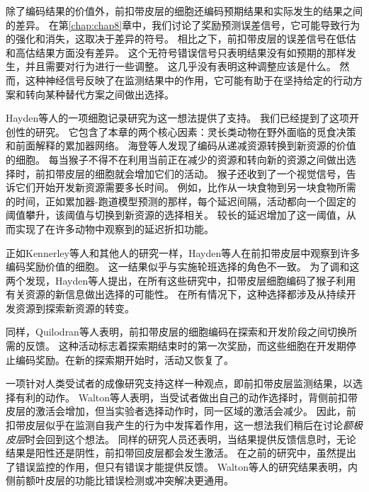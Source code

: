除了编码结果的价值外，前扣带皮层的细胞还编码预期结果和实际发生的结果之间的差异。
在第\ref{chap:chap8}章中，我们讨论了奖励预测误差信号，它可能导致行为的强化和消失，这取决于差异的符号。
相比之下，前扣带皮层的误差信号在低估和高估结果方面没有差异\cite{Hayden et al,2011a}。
这个无符号错误信号只表明结果没有如预期的那样发生，并且需要对行为进行一些调整。
这几乎没有表明这种调整应该是什么。
然而，这种神经信号反映了在监测结果中的作用，它可能有助于在坚持给定的行动方案和转向某种替代方案之间做出选择。\par


Hayden等人\cite{hayden2011neuronal}的一项细胞记录研究为这一想法提供了支持。
我们已经提到了这项开创性的研究。
它包含了本章的两个核心因素：灵长类动物在野外面临的觅食决策和前面解释的累加器网络。
海登等人发现了编码从递减资源转换到新资源的价值的细胞。
每当猴子不得不在利用当前正在减少的资源和转向新的资源之间做出选择时，前扣带皮层的细胞就会增加它们的活动。
猴子还收到了一个视觉信号，告诉它们开始开发新资源需要多长时间。
例如，比作从一块食物到另一块食物所需的时间，正如累加器-跑道模型预测的那样，每个延迟间隔，活动都向一个固定的阈值攀升，该阈值与切换到新资源的选择相关。
较长的延迟增加了这一阈值，从而实现了在许多动物中观察到的延迟折扣功能。\par


正如Kennerley等人和其他人的研究一样\cite{matsumoto2003neuronal,seo2007temporal}，Hayden等人在前扣带皮层中观察到许多编码奖励价值的细胞\cite{hayden2009fictive,hayden2010neurons}。
这一结果似乎与实施轮班选择的角色不一致。
为了调和这两个发现，Hayden等人\cite{hayden2011neuronal}提出，在所有这些研究中，扣带皮层细胞编码了猴子利用有关资源的新信息做出选择的可能性。
在所有情况下，这种选择都涉及从持续开发资源到探索新资源的转变。\par


同样，Quilodran等人\cite{quilodran2008behavioral}表明，前扣带皮层的细胞编码在探索和开发阶段之间切换所需的反馈。
这种活动标志着探索期结束时的第一次奖励，而这些细胞在开发期停止编码奖励。在新的探索期开始时，活动又恢复了。\par


一项针对人类受试者的成像研究支持这样一种观点，即前扣带皮层监测结果，以选择有利的动作。
Walton等人\cite{walton2004interactions}表明，当受试者做出自己的动作选择时，背侧前扣带皮层的激活会增加，但当实验者选择动作时，同一区域的激活会减少。
因此，前扣带皮层似乎在监测自我产生的行为中发挥着作用，这一想法我们稍后在讨论\textit{额极皮层}时会回到这个想法。
同样的研究人员还表明，当结果提供反馈信息时，无论结果是阳性还是阴性，前扣带回皮层都会发生激活。
在之前的研究中，虽然提出了错误监控的作用，但只有错误才能提供反馈\cite{yeung2004neural}。
Walton等人的研究结果表明，内侧前额叶皮层的功能比错误检测或冲突解决更通用。\par



